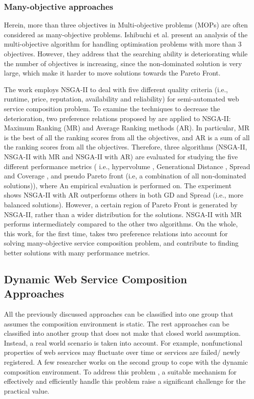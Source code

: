\subsubsection{Many-objective approaches}\label{ManyObjective}

Herein, more than three objectives in Multi-objective problems (MOPs) are often considered as many-objective problems. Ishibuchi et al. \cite{ishibuchi2008evolutionary} present an analysis of the multi-objective algorithm for handling optimisation problems with more than 3 objectives. However, they address that the searching ability is deteriorating while the number of objectives is increasing, since the non-dominated solution is very large, which make it harder to move solutions towards the Pareto Front.

The work \cite{de2010many} employs NSGA-II to deal with five different quality criteria (i.e., runtime, price, reputation, availability and reliability) for semi-automated web service composition problem.  To examine the techniques to decrease the deterioration, two preference relations proposed by \cite{bentley1997finding} are applied to NSGA-II: Maximum Ranking (MR) and Average Ranking methods (AR). In particular, MR is the best of all the ranking scores from all the objectives, and AR is a sum of all the ranking scores from all the objectives. Therefore, three algorithms (NSGA-II, NSGA-II with MR and NSGA-II with AR) are evaluated for studying the five different performance metrics ( i.e., hypervolume \cite{zitzler1999evolutionary}, Generational Distance \cite{van2000measuring}, Spread and Coverage \cite{zitzler2000comparison}, and pseudo Pareto front (i.e, a combination of all non-dominated solutions)),  where An empirical evaluation is performed on. The experiment shows NSGA-II with AR outperforms others in both GD and Spread (i.e., more balanced solutions). However,  a certain region of  Pareto Front is generated by NSGA-II,  rather than a wider distribution for the solutions. NSGA-II with MR performs intermediately compared to the other two algorithms. On the whole,  this work, for the first time, takes two preference relations into account for solving many-objective service composition problem, and contribute to finding better solutions with many performance metrics.


\subsection{Dynamic Web Service Composition Approaches}\label{dynamicserivce}
All the previously discussed approaches can be classified into one group that assumes the composition environment is static. The rest approaches can be classified into another group that does not make that closed world assumption. Instead, a real world scenario is taken into account. For example, nonfunctional properties of web services may fluctuate over time or services are failed/ newly registered. A few researcher works on the second group to cope with the dynamic composition environment. To address this problem \cite{nasridinov2012qos},  a suitable mechanism for effectively and efficiently handle this problem raise a significant challenge for the practical value.


